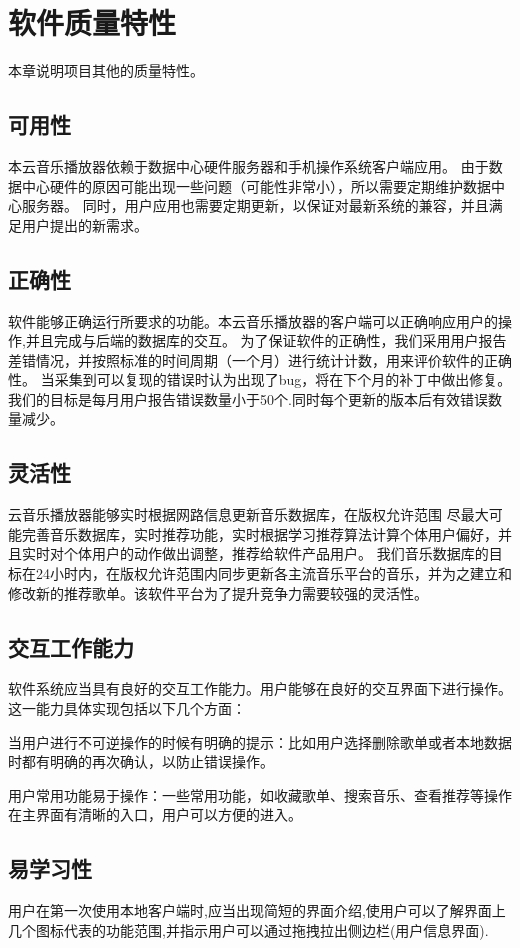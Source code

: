 \chapter{软件质量特性}


本章说明项目其他的质量特性。


\section{可用性}
本云音乐播放器依赖于数据中心硬件服务器和手机操作系统客户端应用。
由于数据中心硬件的原因可能出现一些问题（可能性非常小），所以需要定期维护数据中心服务器。
同时，用户应用也需要定期更新，以保证对最新系统的兼容，并且满足用户提出的新需求。


\section{正确性}
软件能够正确运行所要求的功能。本云音乐播放器的客户端可以正确响应用户的操作,并且完成与后端的数据库的交互。
为了保证软件的正确性，我们采用用户报告差错情况，并按照标准的时间周期（一个月）进行统计计数，用来评价软件的正确性。
当采集到可以复现的错误时认为出现了bug，将在下个月的补丁中做出修复。
我们的目标是每月用户报告错误数量小于50个.同时每个更新的版本后有效错误数量减少。

\section{灵活性}
云音乐播放器能够实时根据网路信息更新音乐数据库，在版权允许范围
尽最大可能完善音乐数据库，实时推荐功能，实时根据学习推荐算法计算个体用户偏好，并且实时对个体用户的动作做出调整，推荐给软件产品用户。
我们音乐数据库的目标在24小时内，在版权允许范围内同步更新各主流音乐平台的音乐，并为之建立和修改新的推荐歌单。该软件平台为了提升竞争力需要较强的灵活性。

\section{交互工作能力}
软件系统应当具有良好的交互工作能力。用户能够在良好的交互界面下进行操作。这一能力具体实现包括以下几个方面：

当用户进行不可逆操作的时候有明确的提示：比如用户选择删除歌单或者本地数据时都有明确的再次确认，以防止错误操作。

用户常用功能易于操作：一些常用功能，如收藏歌单、搜索音乐、查看推荐等操作在主界面有清晰的入口，用户可以方便的进入。


\section{易学习性}
用户在第一次使用本地客户端时,应当出现简短的界面介绍,使用户可以了解界面上几个图标代表的功能范围,并指示用户可以通过拖拽拉出侧边栏(用户信息界面).

